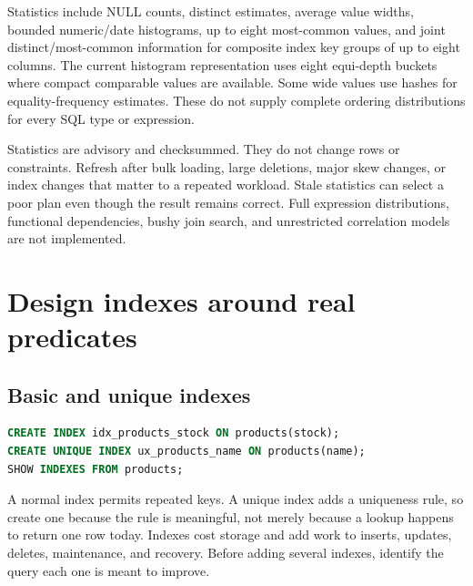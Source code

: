 Statistics include NULL counts, distinct estimates, average value widths, bounded numeric/date histograms, up to eight most-common values, and joint distinct/most-common information for composite index key groups of up to eight columns. The current histogram representation uses eight equi-depth buckets where compact comparable values are available. Some wide values use hashes for equality-frequency estimates. These do not supply complete ordering distributions for every SQL type or expression.

Statistics are advisory and checksummed. They do not change rows or constraints. Refresh after bulk loading, large deletions, major skew changes, or index changes that matter to a repeated workload. Stale statistics can select a poor plan even though the result remains correct. Full expression distributions, functional dependencies, bushy join search, and unrestricted correlation models are not implemented.



\section{Design indexes around real predicates}

\subsection{Basic and unique indexes}

\begin{lstlisting}[language=SQL]
CREATE INDEX idx_products_stock ON products(stock);
CREATE UNIQUE INDEX ux_products_name ON products(name);
SHOW INDEXES FROM products;
\end{lstlisting}

A normal index permits repeated keys. A unique index adds a uniqueness rule, so create one because the rule is meaningful, not merely because a lookup happens to return one row today. Indexes cost storage and add work to inserts, updates, deletes, maintenance, and recovery. Before adding several indexes, identify the query each one is meant to improve.

